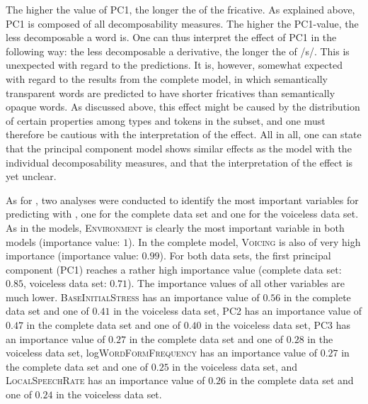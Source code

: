 The higher the value of \textsc{PC1}, the longer the  of the fricative. As explained above, \textsc{PC1} is composed of all decomposability measures. The higher the \textsc{PC1}-value, the less decomposable a word is.
 One can thus interpret the effect of \textsc{PC1} in the following way: the less decomposable a derivative, the longer the  of /s/. This is unexpected with regard to the  predictions. It is, however, somewhat expected with regard to the results from the complete  model, in which semantically transparent words are predicted to have shorter fricatives than semantically opaque words. As discussed above, this effect might be caused by the distribution of certain properties among types and tokens in the subset, and one must therefore be cautious with the interpretation of the effect. All in all, one can state that the principal component model shows similar effects as the model with the individual decomposability measures, and that the interpretation of the  effect is yet unclear.

As for , two  analyses were conduct\-ed to identify the most important variables for predicting  with , one for the complete data set and one for the voiceless data set. 
 As in the  models, \textsc{Environment} is clearly the most important variable in both models (importance value: $1$). In the complete model, \textsc{Voicing} is also of very high importance  (importance value: $0.99$). For both data sets, the first principal component (\textsc{PC1}) reaches a rather high importance value (complete data set: $0.85$,  voiceless data set: $0.71$). The importance values of all other variables are much lower.
\textsc{BaseInitialStress} has an importance value of $0.56$ in the complete data set and one of $0.41$ in the voiceless data set,   
\textsc{PC2} has an importance value of $0.47$ in the complete data set and one of $0.40$ in the voiceless data set,   
\textsc{PC3} has an importance value of $0.27$ in the complete data set and one of $0.28$ in the voiceless data set,   
log\textsc{WordFormFrequency} has an importance value of $0.27$ in the complete data set and one of $0.25$ in the voiceless data set, and  
\textsc{LocalSpeechRate} has an importance value of $0.26$ in the complete data set and one of $0.24$ in the voiceless data set.  

